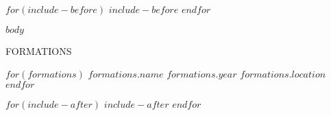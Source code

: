 \documentclass[
$if(fontsize)$
    $fontsize$,
$endif$
$if(lang)$
    $babel-lang$,
$endif$
$if(papersize)$
    $papersize$paper,
$endif$
$for(classoption)$
    $classoption$$sep$,
$endfor$
]{$documentclass$}
\begin{document}
$for(include-before)$
    $include-before$
$endfor$

$body$

\begin{flushleft}
    \large
    FORMATIONS
\end{flushleft}

\footnotesize
$for(formations)$
    $formations.name$ $formations.year$ $formations.location$
$endfor$

$for(include-after)$
    $include-after$
$endfor$

\end{document}
